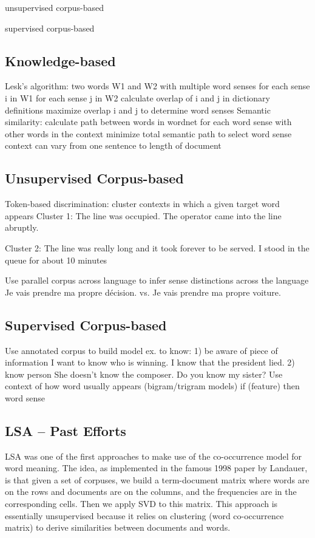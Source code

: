 \documentclass[10pt, letterpaper]{article}
\begin{document}
	unsupervised corpus-based

	supervised corpus-based
	\subsection{Knowledge-based}
	Lesk's algorithm:
	two words W1 and W2 with multiple word senses
	for each sense i in W1
	for each sense j in W2
	calculate overlap of i and j in dictionary definitions
	maximize overlap i and j to determine word senses
	Semantic similarity:
	calculate path between words in wordnet for each word sense with other words in the context
	minimize total semantic path to select word sense
	context can vary from one sentence to length of document
	
	\subsection{Unsupervised Corpus-based}
	 Token-based discrimination: cluster contexts in which a given target word appears
	 Cluster 1: The line was occupied. 
	 The operator came into the line abruptly.

	 Cluster 2: The line was really long and it took forever to be served. 
 	 I stood in the queue for about 10 minutes

 	 Use parallel corpus across language to infer sense distinctions across the language
	 Je vais prendre ma propre décision.
	 vs.
	 Je vais prendre ma propre voiture.
	\subsection{Supervised Corpus-based}
	 Use annotated corpus to build model
 	 ex. to know: 1) be aware of piece of information
                              I want to know who is winning.
                              I know that the president lied.
                             2) know person
                             She doesn't know the composer.
                             Do you know my sister?
	 Use context of how word usually appears (bigram/trigram models)
 	 if (feature) then word sense
 	\subsection{LSA -- Past Efforts}
 	LSA was one of the first approaches to make use of the co-occurrence model for word meaning. The idea, as implemented in the famous 1998 paper by Landauer, is that given a set of corpuses, we build a term-document matrix where words are on the rows and documents are on the columns, and the frequencies are in the corresponding cells.
	Then we apply SVD to this matrix. 
	This approach is essentially unsupervised because it relies on clustering (word co-occurrence matrix) to derive similarities between documents and words. 
\end{document}
